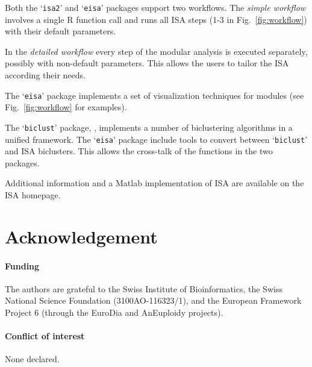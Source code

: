 \documentclass{bioinfo}
\newcommand{\Rpackage}[1]{`\texttt{#1}'}
\begin{document}
Both the \Rpackage{isa2} and \Rpackage{eisa} packages support two
workflows. The \emph{simple workflow} involves a single R function
call and runs all ISA steps (1-3 in Fig.~\ref{fig:workflow}) with
their default parameters.

In the \emph{detailed workflow} every step of the modular analysis 
is executed separately, possibly with non-default parameters. This allows
the users to tailor the ISA according their needs.


The \Rpackage{eisa} package implements a set of visualization
techniques for modules (see Fig.~\ref{fig:workflow} for examples).

The \Rpackage{biclust} package, \citep{biclust}, implements a number of
biclustering algorithms in a unified framework. The \Rpackage{eisa}
package include tools to convert between \Rpackage{biclust} and ISA
biclusters. This allows the cross-talk of the functions in the two
packages.

Additional information and a Matlab implementation of ISA are
available on the ISA homepage. 

\vspace*{-0.5cm}
\section*{Acknowledgement}

\paragraph{Funding\textcolon} The authors are grateful to the Swiss
Institute of Bioinformatics, the Swiss National Science Foundation
(3100AO-116323/1), and the European Framework Project 6 (through
the EuroDia and AnEuploidy projects).
\paragraph{Conflict of interest\textcolon} None declared.



\end{document}
